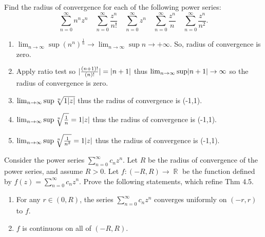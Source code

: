 \documentclass[12pt,letterpaper,boxed]{hmcpset}
\DeclareMathOperator{\R}{\mathbb{R}}
\DeclarePairedDelimiter\abs{\lvert}{\rvert}%
\begin{document}
\begin{problem}[Exercise 4.6]
Find the radius of convergence for each of the following power series: $$
\sum_{n=0}^{\infty} n^{n} z^{n} \quad \sum_{n=0}^{\infty} \frac{z^{n}}{n !} \quad \sum_{n=0}^{\infty} z^{n} \quad \sum_{n=0}^{\infty} \frac{z^{n}}{n} \quad \sum_{n=0}^{\infty} \frac{z^{n}}{n^{2}}
.$$
\end{problem}

\begin{solution}
\begin{enumerate}
    \item $\lim_{n \rightarrow \infty}\sup (n^{n})^{\frac{1}{n}} \rightarrow \lim_{n \rightarrow \infty}\sup n\rightarrow +\infty$. So, radius of convergence is zero.
    \item Apply ratio test so $\abs{\frac{(n + 1)!}{(n)!}} = \abs{n + 1}$ thus $\lim_{n \rightarrow \infty}\sup \abs{n + 1} \rightarrow \infty$ so the radius of convergence is zero. 
    \item $\lim_{n \rightarrow \infty}\sup \sqrt[n]{1\abs{z}}$ thus the radius of convergence is (-1,1).
    \item $\lim_{n \rightarrow \infty}\sup \sqrt[n]{\frac{1}{n}} = 1\abs{z}$ thus the radius of convergence is (-1,1).
    \item $\lim_{n \rightarrow \infty}\sup \sqrt[n]{\frac{1}{n^{2}}} = 1\abs{z}$ thus the radius of convergence is (-1,1).
\end{enumerate}
\end{solution}


\begin{problem}[Exercise 4.7]
Consider the power series $\sum_{n=0}^{\infty} c_nz^{n}$. Let $R$ be the radius of convergence of the power series, and assume $R>0$. Let $f: (-R,R) \rightarrow \R$ be the function defined by $f(z)=\sum_{n=0}^{\infty} c_nz^{n}$. Prove the following statements, which refine Thm 4.5.
\begin{enumerate}
    \item For any $r \in (0, R)$, the series $\sum_{n=0}^{\infty}c_nz^{n}$ converges uniformly on $(-r, r)$ to $f$.
    \item $f$ is continuous on all of $(-R,R)$.
\end{enumerate}
\end{problem}
\end{document}
